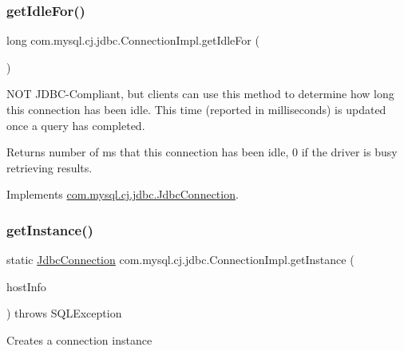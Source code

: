 \subsubsection{\texorpdfstring{get\+Idle\+For()}{getIdleFor()}}
{\footnotesize\ttfamily long com.\+mysql.\+cj.\+jdbc.\+Connection\+Impl.\+get\+Idle\+For (\begin{DoxyParamCaption}{ }\end{DoxyParamCaption})}

N\+OT J\+D\+B\+C-\/\+Compliant, but clients can use this method to determine how long this connection has been idle. This time (reported in milliseconds) is updated once a query has completed.

\begin{DoxyReturn}{Returns}
number of ms that this connection has been idle, 0 if the driver is busy retrieving results. 
\end{DoxyReturn}


Implements \mbox{\hyperlink{interfacecom_1_1mysql_1_1cj_1_1jdbc_1_1_jdbc_connection_a3a242d2fb1e6c443f163d55f8bbd6cde}{com.\+mysql.\+cj.\+jdbc.\+Jdbc\+Connection}}.

\mbox{\label{classcom_1_1mysql_1_1cj_1_1jdbc_1_1_connection_impl_a00ebf86453e09df7221526f2544f6960}} 
\subsubsection{\texorpdfstring{get\+Instance()}{getInstance()}}
{\footnotesize\ttfamily static \mbox{\hyperlink{interfacecom_1_1mysql_1_1cj_1_1jdbc_1_1_jdbc_connection}{Jdbc\+Connection}} com.\+mysql.\+cj.\+jdbc.\+Connection\+Impl.\+get\+Instance (\begin{DoxyParamCaption}\item[{\mbox{\hyperlink{classcom_1_1mysql_1_1cj_1_1conf_1_1_host_info}{Host\+Info}}}]{host\+Info }\end{DoxyParamCaption}) throws S\+Q\+L\+Exception\hspace{0.3cm}{\ttfamily [static]}}

Creates a connection instance \mbox{\label{classcom_1_1mysql_1_1cj_1_1jdbc_1_1_connection_impl_acece4c22f0678d1b70d487c8658f1d49}} 
